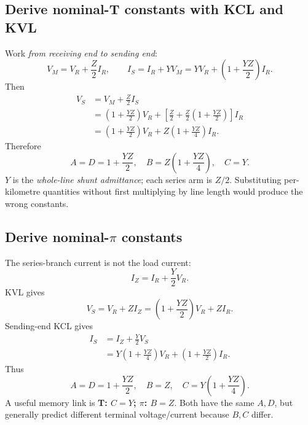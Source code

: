 \documentclass[11pt,a4paper]{article}
\newcommand{\ans}[1]{\boxed{#1}}
\begin{document}
\subsection{Derive nominal-T constants with KCL and KVL}
\begin{center}
\end{center}
Work \emph{from receiving end to sending end}:
\[
 V_M=V_R+\frac Z2I_R,
 \qquad I_S=I_R+YV_M
 =YV_R+\left(1+\frac{YZ}{2}\right)I_R.
\]
Then
\[
 \begin{aligned}
 V_S&=V_M+\frac Z2I_S\\
 &=\left(1+\frac{YZ}{2}\right)V_R+
 \left[\frac Z2+\frac Z2\left(1+\frac{YZ}{2}\right)\right]I_R\\
 &=\left(1+\frac{YZ}{2}\right)V_R+Z\left(1+\frac{YZ}{4}\right)I_R.
 \end{aligned}
\]
Therefore
\[
 \ans{A=D=1+\frac{YZ}{2},\quad B=Z\left(1+\frac{YZ}{4}\right),\quad C=Y}.
\]
$Y$ is the \emph{whole-line shunt admittance}; each series arm is $Z/2$. Substituting per-kilometre quantities without first multiplying by line length would produce the wrong constants.
\subsection{Derive nominal-\texorpdfstring{$\pi$}{pi} constants}
\begin{center}
\end{center}
The series-branch current is not the load current:
\[
 I_Z=I_R+\frac Y2V_R.
\]
KVL gives
\[
 V_S=V_R+ZI_Z
 =\left(1+\frac{YZ}{2}\right)V_R+ZI_R.
\]
Sending-end KCL gives
\[
 \begin{aligned}
 I_S&=I_Z+\frac Y2V_S\\
 &=Y\left(1+\frac{YZ}{4}\right)V_R+
 \left(1+\frac{YZ}{2}\right)I_R.
 \end{aligned}
\]
Thus
\[
 \ans{A=D=1+\frac{YZ}{2},\quad B=Z,\quad C=Y\left(1+\frac{YZ}{4}\right)}.
\]
A useful memory link is \textbf{T: $C=Y$; $\pi$: $B=Z$}. Both have the same $A,D$, but generally predict different terminal voltage/current because $B,C$ differ.
\end{document}
